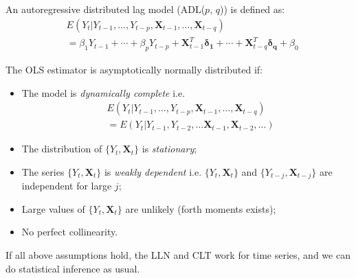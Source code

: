 \documentclass[%
 aip,
 jmp,%
 amsmath,amssymb,
 reprint,%
]{revtex4-1}
\renewcommand{\vec}[1]{\bm{#1}}
\newcommand{\mat}[1]{\bm{#1}}
\begin{document}
An autoregressive distributed lag model (ADL($p$, $q$)) is defined as:
\begin{align*}
    & E(Y_t|Y_{t-1},\dots,Y_{t-p}, \mat{X}_{t-1}, \dots, \mat{X}_{t-q}) \\
    & = \beta_1 Y_{t-1} + \cdots + \beta_p Y_{t-p} 
    + \mat{X}_{t-1}^T \vec{\delta_1} + \cdots + \mat{X}_{t-q}^T \vec{\delta_q} + \beta_0
\end{align*}

The OLS estimator is asymptotically normally distributed if:
    \begin{itemize}
        \item The model is \emph{dynamically complete}  i.e.
            \begin{align*}
                & E(Y_t|Y_{t-1},\dots,Y_{t-p}, \mat{X}_{t-1}, \dots, \mat{X}_{t-q}) \\
                & = E(Y_t|Y_{t-1}, Y_{t-2}, \dots \mat{X}_{t-1}, \mat{X}_{t-2}, \dots)
            \end{align*}
        
        \item The distribution of $\{Y_t, \mat{X}_t\}$ is \emph{stationary};
        \item The series $\{Y_t, \mat{X}_t\}$ is \emph{weakly dependent} i.e. 
                $\{Y_t, \mat{X}_t\}$ and $\{Y_{t-j}, \mat{X}_{t-j}\}$ are independent 
                for large $j$;
        \item Large values of $\{Y_t, \mat{X}_t\}$ are unlikely (forth moments exists);
        \item No perfect collinearity.
    \end{itemize}
    
If all above assumptions hold, the LLN and CLT work for time series, and we can do statistical 
inference as usual. \\

\end{document}
